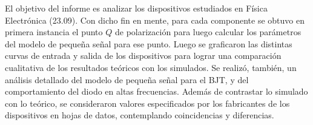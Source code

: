\documentclass[../main.tex]{subfiles}
\begin{document}
El objetivo del informe es analizar los dispositivos estudiados en Física Electrónica (23.09). Con dicho fin en mente, para cada componente se obtuvo en primera instancia el punto $Q$ de polarización para luego calcular los parámetros del modelo de pequeña señal para ese punto. Luego se graficaron las distintas curvas de entrada y salida de los dispositivos para lograr una comparación cualitativa de los resultados teóricos con los simulados. Se realizó, también, un análisis detallado del modelo de pequeña señal para el BJT, y del comportamiento del diodo en altas frecuencias. Además de contrastar lo simulado con lo teórico, se consideraron valores especificados por los fabricantes de los dispositivos en hojas de datos, contemplando coincidencias y diferencias.
\end{document}
